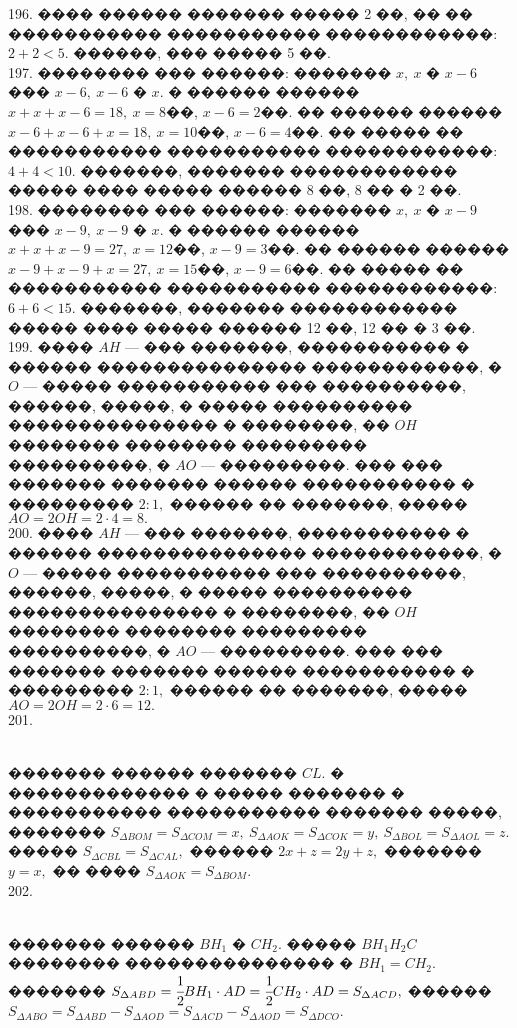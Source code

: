 \documentclass[12pt]{article}
\begin{document}
196. ���� ������ ������� ����� 2 ��, �� �� ����������� ����������� ������������: $2+2<5.$ ������, ��� ����� 5 ��.\\
197. �������� ��� ������: ������� $x,\ x$ � $x-6$ ��� $x-6,\ x-6$ � $x.$ � ������ ������ $x+x+x-6=18,\ x=8$��, $x-6=2$��. �� ������ ������ $x-6+x-6+x=18,\ x=10$��, $x-6=4$��. �� ����� �� ����������� ����������� ������������: $4+4<10.$ �������, ������� ������������ ����� ���� ����� ������ 8 ��, 8 �� � 2 ��.\\
198. �������� ��� ������: ������� $x,\ x$ � $x-9$ ��� $x-9,\ x-9$ � $x.$ � ������ ������ $x+x+x-9=27,\ x=12$��, $x-9=3$��. �� ������ ������ $x-9+x-9+x=27,\ x=15$��, $x-9=6$��. �� ����� �� ����������� ����������� ������������: $6+6<15.$ �������, ������� ������������ ����� ���� ����� ������ 12 ��, 12 �� � 3 ��.\\
199. ���� $AH$ --- ��� �������, ����������� � ������ ��������������� ������������, � $O$ --- ����� ����������� ��� ����������, ������, �����, � ����� ���������� ��������������� � ��������, �� $OH$ �������� �������� ��������� ����������, � $AO$ --- ���������. ��� ��� ������� ������� ������ ����������� � ��������� $2:1,$ ������ �� �������, ����� $AO=2OH=2\cdot4=8.$\\
200. ���� $AH$ --- ��� �������, ����������� � ������ ��������������� ������������, � $O$ --- ����� ����������� ��� ����������, ������, �����, � ����� ���������� ��������������� � ��������, �� $OH$ �������� �������� ��������� ����������, � $AO$ --- ���������. ��� ��� ������� ������� ������ ����������� � ��������� $2:1,$ ������ �� �������, ����� $AO=2OH=2\cdot6=12.$\\
201. \begin{figure}[ht!]
\end{figure}\\
������� ������ ������� $CL.$ � ������������� � ����� ������� � ����������� ����������� ������� �����, ������� $S_{\Delta BOM}=S_{\Delta COM}=x,\
S_{\Delta AOK}=S_{\Delta COK}=y,\ S_{\Delta BOL}=S_{\Delta AOL}=z.$ ����� $S_{\Delta CBL}=S_{\Delta CAL},$ ������ $2x+z=2y+z,$ ������� $y=x,$ �� ���� $S_{\Delta AOK}=S_{\Delta BOM}.$\\
202. \begin{figure}[ht!]
\end{figure}\\
������� ������ $BH_1$ � $CH_2.$ ����� $BH_1H_2C$ �������� ��������������� � $BH_1=CH_2.$ ������� $S_{\Delta ABD}=\cfrac{1}{2}BH_1\cdot AD=\cfrac{1}{2}CH_2\cdot AD=S_{\Delta ACD},$ ������ $S_{\Delta ABO}=S_{\Delta ABD}-S_{\Delta AOD}=S_{\Delta ACD}-S_{\Delta AOD}=S_{\Delta DCO}.$\\
\end{document}
